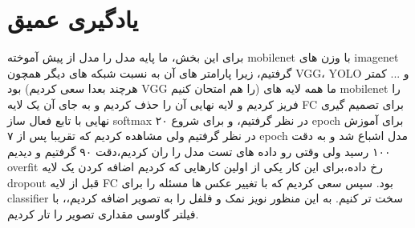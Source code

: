\documentclass{article}
\begin{document}
	\section{یادگیری عمیق}
	برای این بخش، ما پایه مدل را  مدل از پیش آموخته mobilenet با وزن های imagenet گرفتیم، زیرا پارامتر های آن به نسبت شبکه های دیگر همچون VGG، YOLO و ... کمتر بود (هرچند بعدا سعی کردیم VGG را هم امتحان کنیم) ما همه لایه های mobilenet را فریز کردیم و لایه نهایی آن را حذف کردیم و به جای آن یک لایه FC برای تصمیم گیری نهایی با تابع فعال ساز softmax در نظر گرفتیم،‌ و برای شروع ۲۰ epoch برای آموزش در نظر گرفتیم ولی مشاهده کردیم که تقریبا پس از ۷ epoch مدل اشباع شد و به دقت ۱۰۰ رسید ولی وقتی رو داده های تست مدل را ران کردیم،‌دقت ۹۰ گرفتیم و دیدیم overfit رخ داده،‌برای این کار یکی از اولین کارهایی که کردیم اضافه کردن یک لایه dropout قبل از لایه FC بود. سپس سعی کردیم که با تغییر عکس ها مسئله را برای classifier سخت تر کنیم. به این منظور نویز نمک و فلفل را به تصویر اضافه کردیم،، با فیلتر گاوسی مقداری تصویر را تار کردیم.
	
\end{document}
